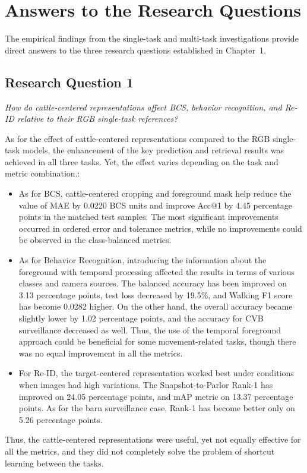 \section{Answers to the Research Questions}

The empirical findings from the single-task and multi-task investigations provide direct answers to the three research questions established in Chapter~1.

\subsection{Research Question 1}
\textit{How do cattle-centered representations affect BCS, behavior recognition, and Re-ID relative to their RGB single-task references?}

As for the effect of cattle-centered representations compared to the RGB single-task models, the enhancement of the key prediction and retrieval results was achieved in all three tasks. Yet, the effect varies depending on the task and metric combination.:
\begin{itemize}
    \item As for BCS, cattle-centered cropping and foreground mask help reduce the value of MAE by 0.0220 BCS units and improve Acc@1 by 4.45 percentage points in the matched test samples. The most significant improvements occurred in ordered error and tolerance metrics, while no improvements could be observed in the class-balanced metrics.
    \item As for Behavior Recognition, introducing the information about the foreground with temporal processing affected the results in terms of various classes and camera sources. The balanced accuracy has been improved on 3.13 percentage points, test loss decreased by 19.5\%, and Walking F1 score has become 0.0282 higher. On the other hand, the overall accuracy became slightly lower by 1.02 percentage points, and the accuracy for CVB surveillance decreased as well. Thus, the use of the temporal foreground approach could be beneficial for some movement-related tasks, though there was no equal improvement in all the metrics.
    \item For Re-ID, the target-centered representation worked best under conditions when images had high variations. The Snapshot-to-Parlor Rank-1 has improved on 24.05 percentage points, and mAP metric on 13.37 percentage points. As for the barn surveillance case, Rank-1 has become better only on 5.26 percentage points.
\end{itemize}
Thus, the cattle-centered representations were useful, yet not equally effective for all the metrics, and they did not completely solve the problem of shortcut learning between the tasks.

